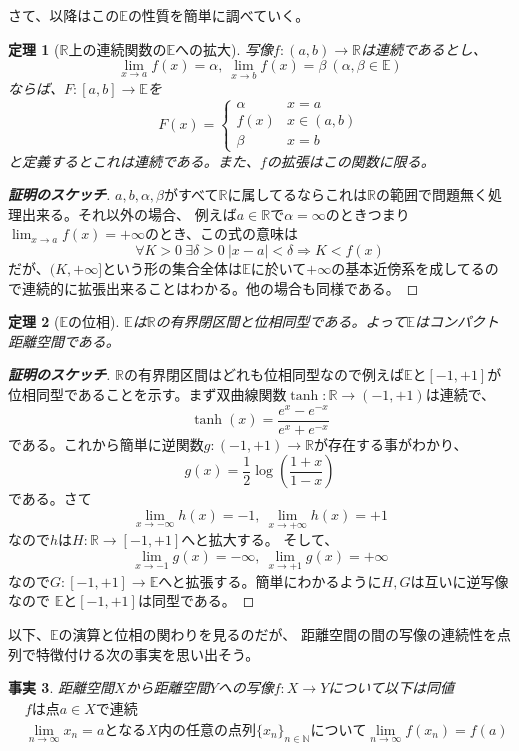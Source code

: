 \documentclass[leqno]{jsarticle}
\newtheorem{thm}{定理}
\newtheorem{fact}[thm]{事実}
\newcommand{\To}{\Longrightarrow}
\newcommand{\nn}{\mathbb{N}}
\newcommand{\rr}{\mathbb{R}}
\newcommand{\mgn}{\infty}
\newcommand{\dpst}{\displaystyle}
\newcommand{\rrr}{\mathbb{E}}
\newcommand{\al}{\alpha}
\newcommand{\be}{\beta}
\begin{document}
さて、以降はこの$\rrr$の性質を簡単に調べていく。
\begin{thm}[$\rr$上の連続関数の$\rrr$への拡大]\label{kakudai}写像$f:(a,b)\to\rr$は連続であるとし、
\[
\lim_{x\to a}f(x)=\al,\ \lim_{x\to b}f(x)=\be\ (\al,\be\in \rrr)
\]
ならば、$F:[a,b]\to \rrr$を
\[
F(x)=
\begin{cases}
\al & \text{$x=a$}\\ 
f(x) & \text{$x\in (a,b)$}\\ 
\be & \text{$x=b$}
\end{cases}
\]
と定義するとこれは連続である。また、$f$の拡張はこの関数に限る。
\end{thm}
\begin{proof}[{\bf 証明のスケッチ}]$a,b,\al,\be$がすべて$\rr$に属してるならこれは$\rr$の範囲で問題無く処理出来る。それ以外の場合、
例えば$a\in \rr$で$\al=\mgn$のときつまり$\dpst \lim_{x\to a}f(x)=+\mgn$のとき、この式の意味は
\[
\forall K>0\ \exists \delta>0\ |x-a|<\delta \To K<f(x)
\]
だが、$(K,+\mgn]$という形の集合全体は$\rrr$に於いて$+\mgn$の基本近傍系を成してるので連続的に拡張出来ることはわかる。他の場合も同様である。
\end{proof}


\begin{thm}[$\rrr$の位相]
$\rrr$は$\rr$の有界閉区間と位相同型である。よって$\rrr$はコンパクト距離空間である。
\end{thm}
\begin{proof}[{\bf 証明のスケッチ}]$\rr$の有界閉区間はどれも位相同型なので例えば$\rrr$と$[-1,+1]$が位相同型であることを示す。まず双曲線関数$\tanh:\rr\to(-1,+1)$は連続で、
\[
\tanh(x)=\frac{e^{x}-e^{-x}}{e^{x}+e^{-x}}
\]
である。これから簡単に逆関数$g:(-1,+1)\to\rr$が存在する事がわかり、
\[
g(x)=\frac{1}{2}\log \left(\frac{1+x}{1-x}\right)
\]
である。さて
\[
\lim_{x\to -\mgn}h(x)=-1,\ \lim_{x\to +\mgn}h(x)=+1
\]
なので$h$は$H:\rr\to[-1,+1]$へと拡大する。
そして、
\[
\lim_{x\to-1}g(x)=-\mgn,\ \lim_{x\to+1}g(x)=+\mgn
\]
なので$G:[-1,+1]\to \rrr$へと拡張する。簡単にわかるように$H,G$は互いに逆写像なので
$\rrr$と$[-1,+1]$は同型である。
\end{proof}


\setcounter{equation}{0}
以下、$\rrr$の演算と位相の関わりを見るのだが、
距離空間の間の写像の連続性を点列で特徴付ける次の事実を思い出そう。
\begin{fact}\label{jijitu}距離空間$X$から距離空間$Y$への写像$f:X\to Y$について以下は同値
\begin{eqnarray}
&fは点a\in Xで連続\\ 
&\lim_{n\to \mgn}x_n=aとなるX内の任意の点列\{x_n\}_{n\in \nn}について\lim_{n\to \mgn}f(x_n)=f(a)
\end{eqnarray}

\end{fact}
\end{document}
